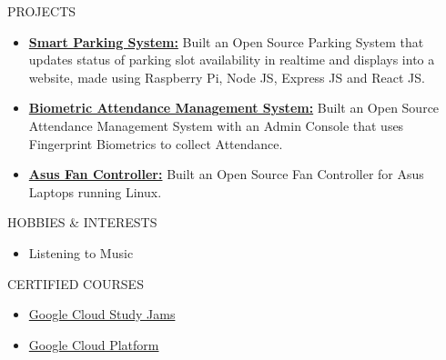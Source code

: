 \documentclass{resume}
\begin{document}
\begin{rSection}{PROJECTS}
\begin{itemize}
    \item \textbf{\href{https://github.com/Arkapravo-Ghosh/Smart-Parking-System}{Smart Parking System:}} {Built an Open Source Parking System that updates status of parking slot availability in realtime and displays into a website, made using Raspberry Pi, Node JS, Express JS and React JS.}

    \item \textbf{\href{https://github.com/Arkapravo-Ghosh/attendance-monitoring-system}{Biometric Attendance Management System:}} {Built an Open Source Attendance Management System with an Admin Console that uses Fingerprint Biometrics to collect Attendance.}

    \item \textbf{\href{https://github.com/Arkapravo-Ghosh/asus-fan-mode}{Asus Fan Controller:}} {Built an Open Source Fan Controller for Asus Laptops running Linux.}
\end{itemize}
\end{rSection}
\vspace{0.8em}

\begin{rSection}{HOBBIES \& INTERESTS}
\begin{itemize}
    \item Listening to Music
\end{itemize}
\end{rSection}
\vspace{0.8em}

\begin{rSection}{CERTIFIED COURSES}
\begin{itemize}
    \item \href{https://www.cloudskillsboost.google/public_profiles/dcbf7583-1c68-4d5c-a408-9ad45d93130d}{Google Cloud Study Jams}
\end{itemize}
\begin{itemize}
    \item \href{https://www.cloudskillsboost.google/public_profiles/7594501c-7933-4fba-be9b-2a92ca3ee410}{Google Cloud Platform}
\end{itemize}
\end{rSection}
\end{document}
